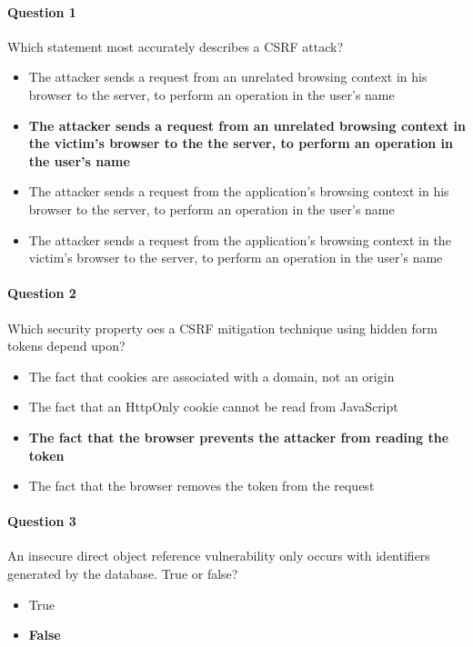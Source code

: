 \documentclass[titlepage]{article}
\begin{document}
    \paragraph{Question 1} Which statement most accurately describes a CSRF attack?
    \begin{itemize}
        \item The attacker sends a request from an unrelated browsing context in his browser to the server, to perform an operation in the user's name
        \item \textbf{The attacker sends a request from an unrelated browsing context in the victim's browser to the the server, to perform an operation in the user's name} \checkmark
        \item The attacker sends a request from the application's browsing context in his browser to the server, to perform an operation in the user's name
        \item The attacker sends a request from the application's browsing context in the victim's browser to the server, to perform an operation in the user's name
    \end{itemize}
    \paragraph{Question 2} Which security property oes a CSRF mitigation technique using hidden form tokens depend upon?
    \begin{itemize}
        \item The fact that cookies are associated with a domain, not an origin
        \item The fact that an HttpOnly cookie cannot be read from JavaScript
        \item \textbf{The fact that the browser prevents the attacker from reading the token} \checkmark
        \item The fact that the browser removes the token from the request
    \end{itemize}
    \paragraph{Question 3} An insecure direct object reference vulnerability only occurs with identifiers generated by the database. True or false?
    \begin{itemize}
        \item True
        \item \textbf{False} \checkmark
    \end{itemize}
\end{document}
